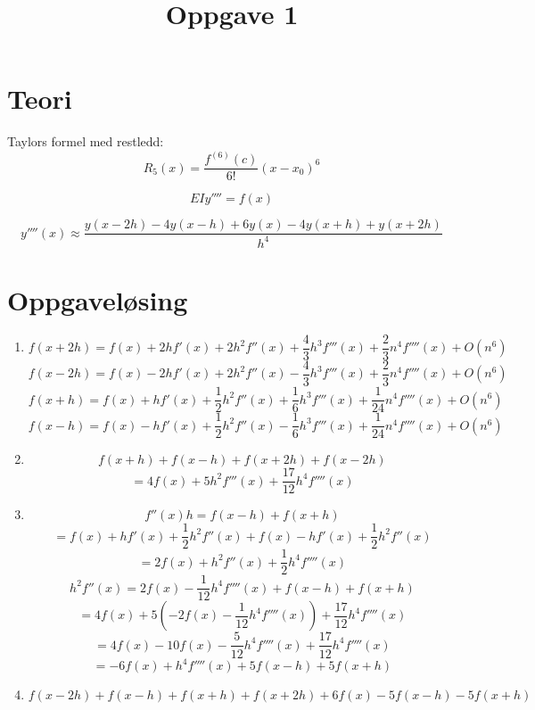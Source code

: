 \documentclass[11pt]{article}
\title{Oppgave 1}
\begin{document}
        \section{Teori}
        Taylors formel med restledd:
        \[R_5(x)= \frac{f^{(6)}(c)} {6!}(x-x_0)^6\]
        
        \[
        EIy''''=f(x)
        \]
        
        \[
            y''''(x) \approx \frac{y(x - 2h)-4y(x - h)+ 6y(x) - 4y(x + h) + y(x + 2h)}{h^4}
        \]

        \section{Oppgaveløsing}

    \begin{enumerate}
        \item \[f(x + 2h) = f(x) + 2hf'(x) + 2h^2f''(x) + \frac{4}{3}h^3f'''(x)+ \frac{2}{3}n^4f''''(x) +O(n^6)\]
         \[f(x - 2h) = f(x) - 2hf'(x) + 2h^2f''(x) - \frac{4}{3}h^3f'''(x)+ \frac{2}{3}n^4f''''(x) +O(n^6)\]
         \[f(x + h) = f(x) + hf'(x) + \frac{1}{2}h^2f''(x) + \frac{1}{6}h^3f'''(x)+ \frac{1}{24}n^4f''''(x) +O(n^6)\]
         \[f(x - h) = f(x) - hf'(x) + \frac{1}{2}h^2f''(x) - \frac{1}{6}h^3f'''(x)+ \frac{1}{24}n^4f''''(x) +O(n^6)\]
        \item \[f(x + h) + f(x - h) + f(x + 2h) + f(x - 2h)\]
        \[= 4f(x) + 5h^2f'''(x) + \frac{17}{12}h^4f''''(x)\]
        \item \[f''(x)h = f(x - h) + f(x + h)\]
        \[= f(x) + hf'(x) + \frac{1}{2}h^2f''(x) + f(x) - hf'(x) + \frac{1}{2}h^2f''(x)\]
        \[= 2f(x) + h^2f''(x) + \frac{1}{2}h^4f''''(x)\]
        \[h^2f''(x) = 2f(x) - \frac{1}{12}h^4f''''(x) + f(x - h) + f(x + h)\]
        \[= 4f(x) + 5(-2f(x)-\frac{1}{12} h^4f''''(x)) + \frac{17}{12}h^4f''''(x)\]
        \[= 4f(x) - 10f(x) - \frac{5}{12}h^4f''''(x) + \frac{17}{12}h^4f''''(x)\]
        \[= -6f(x) + h^4f''''(x) + 5f(x - h) + 5f(x + h)\]
        \item \[f(x - 2h) + f(x - h) + f(x + h) + f(x + 2h) + 6f(x) - 5f(x - h) - 5f(x + h)\]
        
    \end{enumerate}
        

        

        
\end{document}
